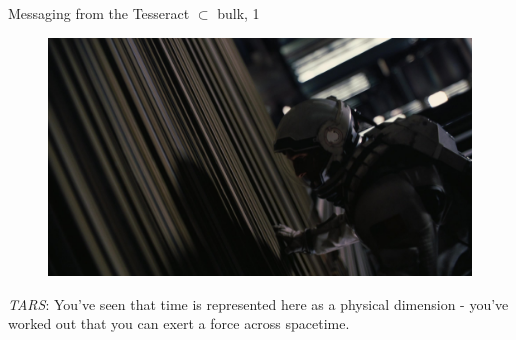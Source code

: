 \documentclass{beamer}
\begin{document}
\begin{frame}{Messaging from the Tesseract $\subset$ bulk, 1}
	
	\begin{figure}
		\includegraphics[width=\textwidth]{images/1201204.jpg}
	\end{figure}
	
	\emph{TARS}: You've seen that time is represented here as a physical dimension - you've worked out that you can exert a force across spacetime.
	
\end{frame}
\end{document}
